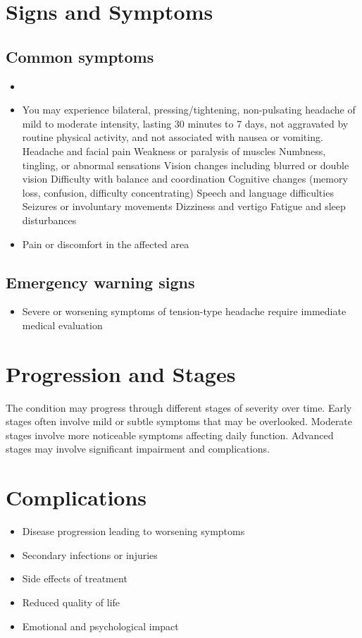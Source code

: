 \section{Signs and Symptoms}
\subsection{Common symptoms}
\begin{itemize}[noitemsep]
  \item \item You may experience bilateral, pressing/tightening, non-pulsating headache of mild to moderate intensity, lasting 30 minutes to 7 days, not aggravated by routine physical activity, and not associated with nausea or vomiting. Headache and facial pain Weakness or paralysis of muscles Numbness, tingling, or abnormal sensations Vision changes including blurred or double vision Difficulty with balance and coordination Cognitive changes (memory loss, confusion, difficulty concentrating) Speech and language difficulties Seizures or involuntary movements Dizziness and vertigo Fatigue and sleep disturbances
  \item Pain or discomfort in the affected area
  \end{itemize}
\subsection{Emergency warning signs}
\begin{itemize}[noitemsep]
  \item Severe or worsening symptoms of tension-type headache require immediate medical evaluation
\end{itemize}
\section{Progression and Stages}
The condition may progress through different stages of severity over time. Early stages often involve mild or subtle symptoms that may be overlooked. Moderate stages involve more noticeable symptoms affecting daily function. Advanced stages may involve significant impairment and complications.
\section{Complications}
\begin{itemize}[noitemsep]
  \item Disease progression leading to worsening symptoms
  \item Secondary infections or injuries
  \item Side effects of treatment
  \item Reduced quality of life
  \item Emotional and psychological impact
\end{itemize}
